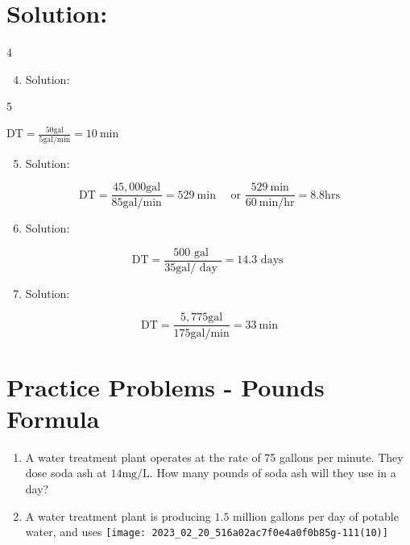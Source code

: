\documentclass[10pt]{article}
\begin{document}
\begin{enumerate}
\begin{enumerate}
\section{Solution:}
4

\begin{enumerate}
  \setcounter{enumi}{3}
  \item Solution:
\end{enumerate}

5

$\mathrm{DT}=\frac{50 \mathrm{gal}}{5 \mathrm{gal} / \mathrm{min}}=10 \mathrm{~min}$

\begin{enumerate}
  \setcounter{enumi}{4}
  \item Solution:
\end{enumerate}

$$
\mathrm{DT}=\frac{45,000 \mathrm{gal}}{85 \mathrm{gal} / \mathrm{min}}=529 \mathrm{~min} \quad \text { or } \frac{529 \mathrm{~min}}{60 \mathrm{~min} / \mathrm{hr}}=8.8 \mathrm{hrs}
$$

\begin{enumerate}
  \setcounter{enumi}{5}
  \item Solution:
\end{enumerate}

$$
\mathrm{DT}=\frac{500 \text { gal }}{35 \mathrm{gal} / \text { day }}=14.3 \text { days }
$$

\begin{enumerate}
  \setcounter{enumi}{6}
  \item Solution:
\end{enumerate}

$$
\mathrm{DT}=\frac{5,775 \mathrm{gal}}{175 \mathrm{gal} / \mathrm{min}}=33 \mathrm{~min}
$$

\section{Practice Problems - Pounds Formula}
\begin{enumerate}
  \item A water treatment plant operates at the rate of 75 gallons per minute. They dose soda ash at $14 \mathrm{mg} / \mathrm{L}$. How many pounds of soda ash will they use in a day?

  \item A water treatment plant is producing $1.5$ million gallons per day of potable water, and uses
\texttt{[image: 2023\_02\_20\_516a02ac7f0e4a0f0b85g-111(10)]}


\end{enumerate}
\end{enumerate}
\end{enumerate}
\end{document}
